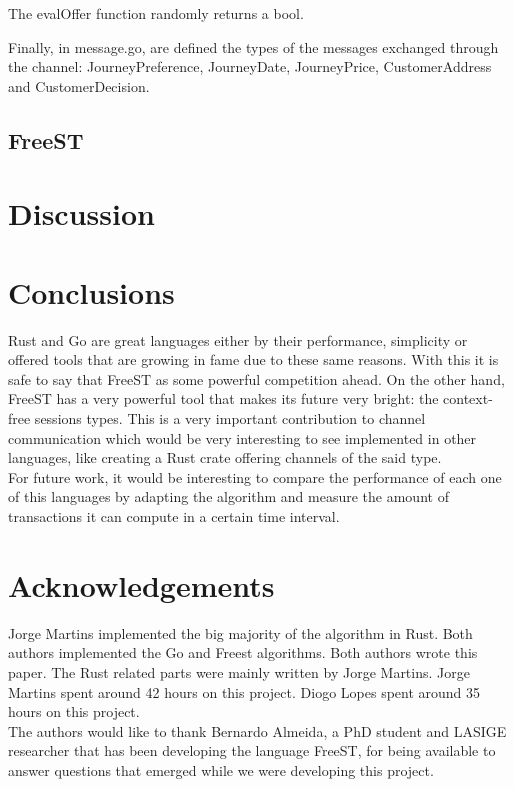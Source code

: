 \documentclass[runningheads]{llncs}
\begin{document}
The evalOffer function randomly returns a bool. 

Finally, in message.go, are defined the types of the messages exchanged through the channel: JourneyPreference, JourneyDate, JourneyPrice, CustomerAddress and CustomerDecision. 
\subsection{FreeST}
\lipsum[1]
\section{Discussion}
\section{Conclusions}
Rust and Go are great languages either by their performance, simplicity or offered tools that are growing in fame due to these same reasons. With this it is safe to say that FreeST as some powerful competition ahead. On the other hand, FreeST has a very powerful tool that makes its future very bright: the context-free sessions types.
This is a very important contribution to channel communication which would be very interesting to see implemented in other languages, like creating a Rust crate offering channels of the said type.
\\For future work, it would be interesting to compare the performance of each one of this languages by adapting the algorithm and measure the amount of transactions it can compute in a certain time interval.
\section*{Acknowledgements}
Jorge Martins implemented the big majority of the algorithm in Rust. Both authors implemented the Go and Freest algorithms.
Both authors wrote this paper. The Rust related parts were mainly written by Jorge Martins.
Jorge Martins spent around 42 hours on this project. Diogo Lopes spent around 35 hours on this project.\\
The authors would like to thank Bernardo Almeida, a PhD student and LASIGE researcher that has been developing the language FreeST, for being available to answer questions that emerged while we were developing this project.


\end{document}
